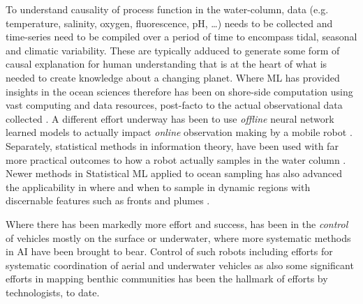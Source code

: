 To understand causality of process function in the water-column, data
(e.g. temperature, salinity, oxygen, fluorescence, pH, \ldots) needs
to be collected and time-series need to be compiled over a period of
time to encompass tidal, seasonal and climatic variability. These are
typically adduced to generate some form of causal explanation for
human understanding that is at the heart of what is needed to create
knowledge about a changing planet. Where ML has provided insights in
the ocean sciences therefore has been on shore-side computation using
vast computing and data resources, post-facto to the actual
observational data collected . A different effort
underway has been to use \emph{offline} neural network learned models
to actually impact \emph{online} observation making by a mobile robot
\cite{saad20} . Separately, statistical methods in information theory, have
been used with far more practical outcomes to how a robot actually
samples in the water column
\cite{jdas13,das15,fossum18,fossum18b}. Newer methods in Statistical
ML applied to ocean sampling has also advanced the applicability in
where and when to sample in dynamic regions with discernable features
such as fronts and plumes \cite{fossum21}.

Where there has been markedly more effort and success, has been in the
\emph{control} of vehicles mostly on the surface or underwater, where
more systematic methods in AI have been brought to bear. Control of
such robots
\cite{benjamin2010,das11,das11b,olaya12,graham12,fossum18,fossum18b,pinto20}
including efforts for systematic coordination of aerial and underwater
vehicles \cite{Ferreira2018} as also some significant efforts in
mapping benthic communities \cite{johnson17} has been the hallmark of
efforts by technologists, to date.




